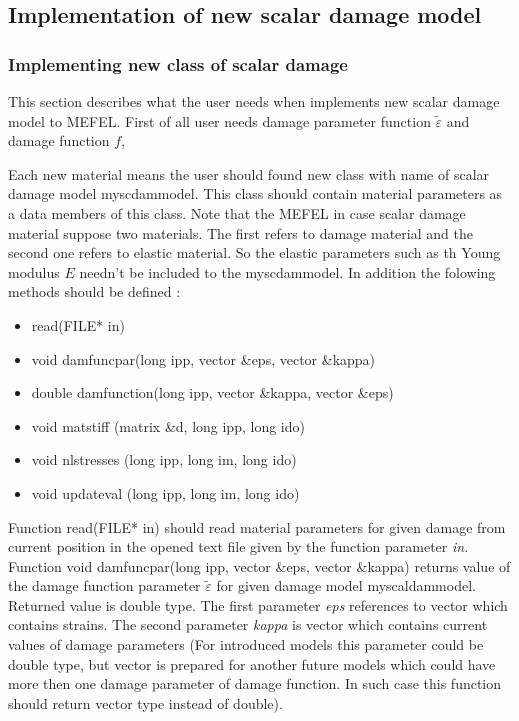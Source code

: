 
\subsection{Implementation of new scalar damage  model}
\subsubsection {Implementing new class of scalar damage}
This section describes what the user needs when implements new scalar damage model
to MEFEL. First of all user needs damage parameter function $\tilde {\varepsilon}$ and damage function $f$,

Each new material means the user should found new class with name of scalar damage model {\sf myscdammodel}.
This class should contain material parameters as a data members of this class. Note that the MEFEL
in case scalar damage material suppose two materials. The first refers to damage material and the second
one refers to elastic material. So the elastic parameters such as th Young modulus $E$ needn't be
included to the {\sf myscdammodel}. In addition the folowing methods should be defined :
\begin{itemize}
\item
{\sf read(FILE* in)}
\item
{\sf void damfuncpar(long ipp, vector \&eps, vector \&kappa)}
\item
{\sf double damfunction(long ipp, vector \&kappa, vector \&eps)}
\item
{\sf void matstiff (matrix \&d, long ipp, long ido)}
\item
{\sf void nlstresses (long ipp, long im, long ido)}
\item
{\sf void updateval (long ipp, long im, long ido)}

\end{itemize}

Function {\sf read(FILE* in)} should read material parameters for given damage from current
position in the opened text file given by the function parameter {\it in}.\\

Function {\sf void damfuncpar(long ipp, vector \&eps, vector \&kappa)} returns value of the damage
function parameter $\tilde {\varepsilon}$ for given damage model {\sf myscaldammodel}.
Returned value is double type. The first parameter {\it eps} references to vector which contains strains.
The second parameter {\it kappa} is vector which contains current values of damage parameters (For
introduced models this parameter could be {\sf double} type, but {\sf vector} is prepared for another
future models which could have more then one damage parameter of damage function. In such case this
function should return {\sf vector} type instead of {\sf double}).\\

